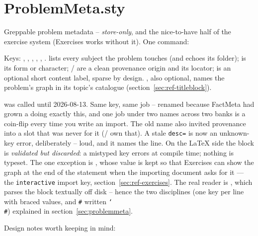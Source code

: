 \section{ProblemMeta.sty}\label{sec:ref-problemmeta}

Greppable problem metadata -- \emph{store-only}, and the nice-to-have half
of the exercise system (Exercises works without it). One command:

\begin{manexsource}
\end{manexsource}

Keys: , , , ,
, .  lists every subject the problem
touches (and echoes its folder);  is its form or character;
/ are a clean provenance origin and its locator;
 is an optional short content label, sparse by design.
, also optional, names the problem's graph in its topic's
 catalogue (section~\ref{sec:ref-titleblock}).

 was called  until 2026-08-13. Same key, same job --
renamed because FactMeta had grown a  doing exactly this, and one
job under two names across two banks is a coin-flip every time you write an
import. The old name also invited provenance into a slot that was never for it
(/ own that). A stale \texttt{desc=} is now an
unknown-key error, deliberately -- loud, and it names the line.
On the LaTeX side the block is \emph{validated but discarded}: a mistyped
key errors at compile time; nothing is typeset. The one exception is
, whose value is kept so that Exercises can show the graph
at the end of the statement when the importing document asks for it ---
the \texttt{interactive} import key, section~\ref{sec:ref-exercises}. The real reader is
, which parses the block textually off disk -- hence
the two disciplines (one key per line with braced values, and \texttt{\#}
written \texttt{\char`\\\#}) explained in section~\ref{sec:problemmeta}.

Design notes worth keeping in mind:

